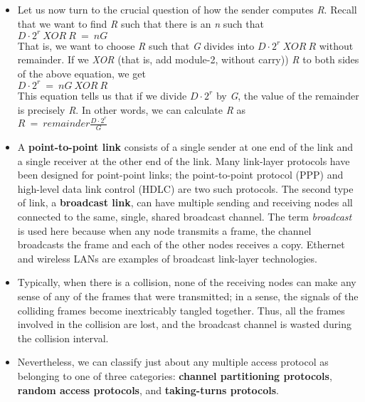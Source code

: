 \begin{itemize}
\item
Let us now turn to the crucial question of how the sender computes \textit{R}. Recall that we want to find \textit{R} such that there is an \textit{n} such that\\
\hspace*{1em}\(D\cdot2^r\ XOR\ R\ =\ nG\)\\
That is, we want to choose \textit{R} such that \textit{G} divides into \(D\cdot2^r\ XOR\ R\) without remainder. If we \textit{XOR} (that is, add module-2, without carry)) \textit{R} to both sides of the above equation, we get\\
\hspace*{1em}\(D\cdot2^r\ =\ nG\ XOR\ R\)\\
This equation tells us that if we divide \(D\cdot2^r\) by \textit{G}, the value of the remainder is precisely \textit{R}. In other words, we can calculate \textit{R} as\\
\hspace*{1em}\(R\ =\ remainder\frac{D\cdot2^r}{G}\)

\item
A \textbf{point-to-point link} consists of a single sender at one end of the link and a single receiver at the other end of the link. Many link-layer protocols have been designed for point-point links; the point-to-point protocol (PPP) and high-level data link control (HDLC) are two such protocols. The second type of link, a \textbf{broadcast link}, can have multiple sending and receiving nodes all connected to the same, single, shared broadcast channel. The term \textit{broadcast} is used here because when any node transmits a frame, the channel broadcasts the frame and each of the other nodes receives a copy. Ethernet and wireless LANs are examples of broadcast link-layer technologies.

\item
Typically, when there is a collision, none of the receiving nodes can make any sense of any of the frames that were transmitted; in a sense, the signals of the colliding frames become inextricably tangled together. Thus, all the frames involved in the collision are lost, and the broadcast channel is wasted during the collision interval.

\item
Nevertheless, we can classify just about any multiple access protocol as belonging to one of three categories: \textbf{channel partitioning protocols}, \textbf{random access protocols}, and \textbf{taking-turns protocols}.


\end{itemize}
